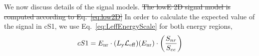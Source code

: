 We now discuss details of the signal models. \sout{The lowE 2D signal model is computed according to Eq.~\ref{eq:low2D}}
In order to calculate the expected value of the signal in cS1, we use Eq.~\ref{eq:LeffEnergyScale} for both energy regions, 
\begin{equation}
\label{eq:LeffEnergyScale}
	cS1 = E_{\mathrm{nr}} \cdot (L_{\mathrm{y}} \mathcal{L}_{\mathrm{eff}})(E_{\mathrm{nr}})\cdot   \left(\frac{S_{nr}}{S_{ee}}\right) 
\end{equation}

%
%
%

